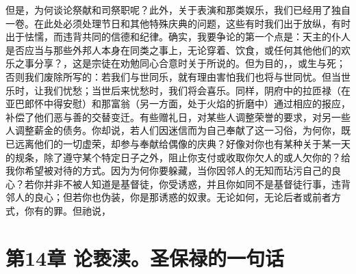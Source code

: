 但是，为何谈论祭献和司祭职呢？此外，关于表演和那类娱乐，我们已经用了独自一卷。在此处必须处理节日和其他特殊庆典的问题，这些有时我们出于放纵，有时出于怯懦，而违背共同的信德和纪律。确实，我要争论的第一个点是：天主的仆人是否应当与那些外邦人本身在同类之事上，无论穿着、饮食，或任何其他他们的欢乐之事分享？，这是宗徒在劝勉同心合意时关于所说的。但为目的，，或生与死；否则我们废除所写的：若我们与世同乐，就有理由害怕我们也将与世同忧。但当世乐时，让我们忧愁；当世后来忧愁时，我们将会喜乐。同样，阴府中的拉匝禄（在亚巴郎怀中得安慰）和那富翁（另一方面，处于火焰的折磨中）通过相应的报应，补偿了他们恶与善的交替变迁。有些赠礼日，对某些人调整荣誉的要求，对另一些人调整薪金的债务。你却说，若人们因迷信而为自己奉献了这一习俗，为何你，既已远离他们的一切虚荣，却参与奉献给偶像的庆典？好像对你也有某种关于某一天的规条，除了遵守某个特定日子之外，阻止你支付或收取你欠人的或人欠你的？给我你希望被对待的方式。因为为何你要躲藏，当你因邻人的无知而玷污自己的良心？若你并非不被人知道是基督徒，你受诱惑，并且你如同不是基督徒行事，违背邻人的良心；但若你也伪装，你是那诱惑的奴隶。无论如何，无论后者或前者方式，你有的罪。但祂说，\par


\section{第14章 论亵渎。圣保禄的一句话}

